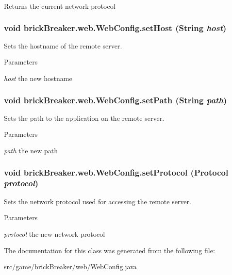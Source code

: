 \begin{DoxyReturn}{Returns}
the current network protocol 
\end{DoxyReturn}
\hypertarget{classbrick_breaker_1_1web_1_1_web_config_a9746602db48181b7228b39c85bb7b34e}{
\subsubsection[{setHost}]{\setlength{\rightskip}{0pt plus 5cm}void brickBreaker.web.WebConfig.setHost (String {\em host})}}
\label{classbrick_breaker_1_1web_1_1_web_config_a9746602db48181b7228b39c85bb7b34e}
Sets the hostname of the remote server.


\begin{DoxyParams}{Parameters}
\item[{\em host}]the new hostname \end{DoxyParams}
\hypertarget{classbrick_breaker_1_1web_1_1_web_config_a3f4efd872b5cc690c9511a4d2e49ee89}{
\subsubsection[{setPath}]{\setlength{\rightskip}{0pt plus 5cm}void brickBreaker.web.WebConfig.setPath (String {\em path})}}
\label{classbrick_breaker_1_1web_1_1_web_config_a3f4efd872b5cc690c9511a4d2e49ee89}
Sets the path to the application on the remote server.


\begin{DoxyParams}{Parameters}
\item[{\em path}]the new path \end{DoxyParams}
\hypertarget{classbrick_breaker_1_1web_1_1_web_config_acc5392f5644d6ca1a30736ca776a24eb}{
\subsubsection[{setProtocol}]{\setlength{\rightskip}{0pt plus 5cm}void brickBreaker.web.WebConfig.setProtocol ({\bf Protocol} {\em protocol})}}
\label{classbrick_breaker_1_1web_1_1_web_config_acc5392f5644d6ca1a30736ca776a24eb}
Sets the network protocol used for accessing the remote server.


\begin{DoxyParams}{Parameters}
\item[{\em protocol}]the new network protocol \end{DoxyParams}


The documentation for this class was generated from the following file:\begin{DoxyCompactItemize}
\item 
src/game/brickBreaker/web/WebConfig.java\end{DoxyCompactItemize}
